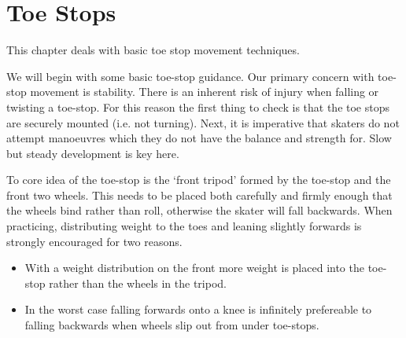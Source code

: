 \chapter{Toe Stops}
\label{ch:toe_stops}

This chapter deals with basic toe stop movement techniques.


We will begin with some basic toe-stop guidance.
Our primary concern with toe-stop movement is stability.
There is an inherent risk of injury when falling or twisting a toe-stop.  
For this reason the first thing to check is that the toe stops are securely mounted (i.e. not turning).   
Next, it is imperative that skaters do not attempt manoeuvres which they do not have the balance and strength for.
Slow but steady development is key here. 


To core idea of the toe-stop is the `front tripod' formed by the toe-stop and the front two wheels.  
This needs to be placed both carefully and firmly enough that the wheels bind rather than roll, otherwise the skater will fall backwards. 
When practicing, distributing weight to the toes and leaning slightly forwards is strongly encouraged for two reasons.
\begin{itemize}
\item With a weight distribution on the front more weight is placed into the toe-stop rather than the wheels in the tripod.   
\item In the worst case falling forwards onto a knee is infinitely prefereable to falling backwards when wheels slip out from under toe-stops. 
\end{itemize}



